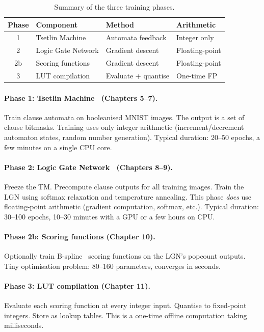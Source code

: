 \begin{table}[htbp]
\centering
\caption{Summary of the three training phases.}
\label{tab:three-phases}
\begin{tabular}{@{}clll@{}}
  \toprule
  \textbf{Phase} & \textbf{Component} & \textbf{Method}
    & \textbf{Arithmetic} \\
  \midrule
  1 & Tsetlin Machine & Automata feedback & Integer only \\
  2 & Logic Gate Network & Gradient descent & Floating-point \\
  2b & Scoring functions & Gradient descent & Floating-point \\
  3 & LUT compilation & Evaluate + quantise & One-time FP \\
  \bottomrule
\end{tabular}
\end{table}

\paragraph{Phase 1: Tsetlin Machine~\cite{granmo2018tsetlin} (Chapters 5--7).}
Train clause automata on booleanised MNIST images. The output is
a set of clause bitmasks. Training uses only integer arithmetic
(increment/decrement automaton states, random number generation).
Typical duration: 20--50 epochs, a few minutes on a single CPU core.

\paragraph{Phase 2: Logic Gate Network~\cite{petersen2022difflogic} (Chapters 8--9).}
Freeze the TM. Precompute clause outputs for all training images.
Train the LGN using softmax relaxation and temperature annealing.
This phase \emph{does} use floating-point arithmetic (gradient
computation, softmax, etc.). Typical duration: 30--100 epochs,
10--30 minutes with a GPU or a few hours on CPU.

\paragraph{Phase 2b: Scoring functions (Chapter 10).}
Optionally train B-spline~\cite{deboor1978splines} scoring functions on the LGN's popcount
outputs. Tiny optimisation problem: 80--160 parameters, converges
in seconds.

\paragraph{Phase 3: LUT compilation (Chapter 11).}
Evaluate each scoring function at every integer input. Quantise to
fixed-point integers. Store as lookup tables. This is a one-time
offline computation taking milliseconds.

